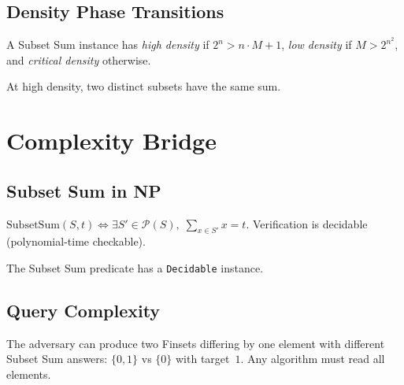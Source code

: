 \section{Density Phase Transitions}

\begin{definition}
  \label{def:density}
  \leanok
  A Subset Sum instance has \emph{high density} if $2^n > n \cdot M + 1$,
  \emph{low density} if $M > 2^{n^2}$, and \emph{critical density} otherwise.
\end{definition}

\begin{theorem}
  \label{thm:pigeonhole_collision}
  \leanok
  At high density, two distinct subsets have the same sum.
\end{theorem}

\chapter{Complexity Bridge}

\section{Subset Sum in NP}

\begin{theorem}
  \label{thm:subset_sum_np}
  \leanok
  $\mathrm{SubsetSum}(S, t) \iff \exists S' \in \mathcal{P}(S),\; \sum_{x \in S'} x = t$.
  Verification is decidable (polynomial-time checkable).
\end{theorem}

\begin{theorem}
  \label{thm:subset_sum_decidable}
  \leanok
  The Subset Sum predicate has a \texttt{Decidable} instance.
\end{theorem}

\section{Query Complexity}

\begin{theorem}
  \label{thm:query_lower_bound}
  \leanok
  The adversary can produce two Finsets differing by one element
  with different Subset Sum answers: $\{0, 1\}$ vs $\{0\}$ with target~$1$.
  Any algorithm must read all elements.
\end{theorem}

